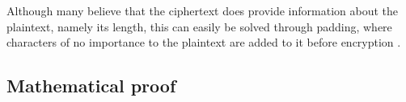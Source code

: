 \documentclass[12pt]{report}
\theoremstyle{definition}
\theoremstyle{remark}
\begin{document}
Although many believe that the ciphertext does provide information about the plaintext, namely its length, this can easily be solved through padding, where characters of no importance to the plaintext are added to it before encryption \cite{HutSix}.

\subsection{Mathematical proof}






%

\end{document}
